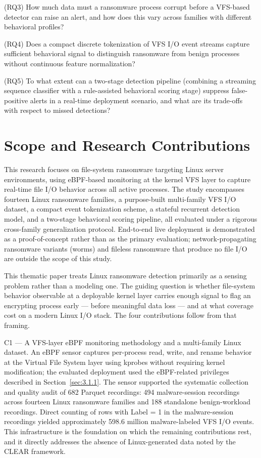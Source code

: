 (RQ3)	How much data must a ransomware process corrupt before a VFS-based detector can raise an alert, and how does this vary across families with different behavioral profiles?

(RQ4)	Does a compact discrete tokenization of VFS I/\allowbreak{}O event streams capture sufficient behavioral signal to distinguish ransomware from benign processes without continuous feature normalization?

(RQ5)	To what extent can a two-stage detection pipeline (combining a streaming sequence classifier with a rule-assisted behavioral scoring stage) suppress false-positive alerts in a real-time deployment scenario, and what are its trade-offs with respect to missed detections?

\section{Scope and Research Contributions}\label{sec:1.5}

This research focuses on file-system ransomware targeting Linux server environments, using eBPF-based monitoring at the kernel VFS layer to capture real-time file I/\allowbreak{}O behavior across all active processes. The study encompasses fourteen Linux ransomware families, a purpose-built multi-family VFS I/\allowbreak{}O dataset, a compact event tokenization scheme, a stateful recurrent detection model, and a two-stage behavioral scoring pipeline, all evaluated under a rigorous cross-family generalization protocol. End-to-end live deployment is demonstrated as a proof-of-concept rather than as the primary evaluation; network-propagating ransomware variants (worms) and fileless ransomware that produce no file I/\allowbreak{}O are outside the scope of this study.

This thematic paper treats Linux ransomware detection primarily as a sensing problem rather than a modeling one. The guiding question is whether file-system behavior observable at a deployable kernel layer carries enough signal to flag an encrypting process early --- before meaningful data loss --- and at what coverage cost on a modern Linux I/\allowbreak{}O stack. The four contributions follow from that framing.

C1 --- A VFS-layer eBPF monitoring methodology and a multi-family Linux dataset. An eBPF sensor captures per-process read, write, and rename behavior at the Virtual File System layer using kprobes without requiring kernel modification; the evaluated deployment used the eBPF-related privileges described in Section~\ref{sec:3.1.1}. The sensor supported the systematic collection and quality audit of 682 Parquet recordings: 494 malware-session recordings across fourteen Linux ransomware families and 188 standalone benign-workload recordings. Direct counting of rows with Label = 1 in the malware-session recordings yielded approximately 598.6 million malware-labeled VFS I/\allowbreak{}O events. This infrastructure is the foundation on which the remaining contributions rest, and it directly addresses the absence of Linux-generated data noted by the CLEAR framework.

